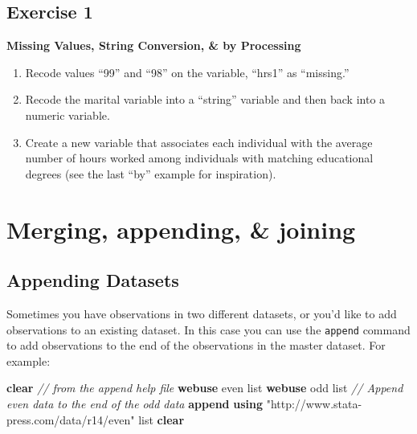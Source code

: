 \documentclass[
]{book}
\newenvironment{Shaded}{\begin{snugshade}}{\end{snugshade}}
\newcommand{\CommentTok}[1]{\textcolor[rgb]{0.56,0.35,0.01}{\textit{#1}}}
\newcommand{\KeywordTok}[1]{\textcolor[rgb]{0.13,0.29,0.53}{\textbf{#1}}}
\newcommand{\NormalTok}[1]{#1}
\newcommand{\OtherTok}[1]{\textcolor[rgb]{0.56,0.35,0.01}{#1}}
\newcommand{\StringTok}[1]{\textcolor[rgb]{0.31,0.60,0.02}{#1}}
\providecommand{\tightlist}{%
  \setlength{\itemsep}{0pt}\setlength{\parskip}{0pt}}
\begin{document}
\hypertarget{exercise-1-7}{%
\subsection{Exercise 1}\label{exercise-1-7}}

\textbf{Missing Values, String Conversion, \& by Processing}

\begin{enumerate}
\def\labelenumi{\arabic{enumi}.}
\tightlist
\item
  Recode values ``99'' and ``98'' on the variable, ``hrs1'' as ``missing.''
\item
  Recode the marital variable into a ``string'' variable and then back into a numeric variable.
\item
  Create a new variable that associates each individual with the average number of hours worked among individuals with matching educational degrees (see the last ``by'' example for inspiration).
\end{enumerate}

\hypertarget{merging-appending-joining}{%
\section{Merging, appending, \& joining}\label{merging-appending-joining}}

\hypertarget{appending-datasets}{%
\subsection{Appending Datasets}\label{appending-datasets}}

Sometimes you have observations in two different datasets, or you'd like to add observations to an existing dataset. In this case you can use the \texttt{append} command to add observations to the end of the observations in the master dataset. For example:

\begin{Shaded}
\begin{Highlighting}[]
  \KeywordTok{clear}
  \CommentTok{// from the append help file}
  \KeywordTok{webuse}\NormalTok{ even}
  \OtherTok{list}
  \KeywordTok{webuse}\NormalTok{ odd}
  \OtherTok{list}
  \CommentTok{// Append even data to the end of the odd data}
  \KeywordTok{append} \KeywordTok{using} \StringTok{"http://www.stata-press.com/data/r14/even"}
  \OtherTok{list}
  \KeywordTok{clear}
\end{Highlighting}
\end{Shaded}
\end{document}
